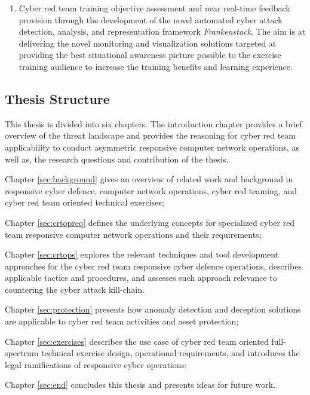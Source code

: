 \begin{enumerate}
    \item Cyber red team training objective assessment and near real-time feedback provision through the development of the novel automated cyber attack detection, analysis, and representation framework \textit{Frankenstack}. The aim is at delivering the novel monitoring and visualization solutions targeted at providing the best situational awareness picture possible to the exercise training audience to increase the training benefits and learning experience.
\end{enumerate}


\subsection{Thesis Structure}
\label{sec:structure}
\glsresetall
This thesis is divided into six chapters. The introduction chapter provides a brief overview of the threat landscape and provides the reasoning for cyber red team applicability to conduct asymmetric responsive computer network operations, as well as, the research questions and contribution of the thesis.

Chapter \ref{sec:background} gives an overview of related work and background in responsive cyber defence, computer network operations, cyber red teaming, and cyber red team oriented technical exercises;

Chapter \ref{sec:crtopreq} defines the underlying concepts for specialized cyber red team responsive computer network operations and their requirements;

Chapter \ref{sec:crtops} explores the relevant techniques and tool development approaches for the cyber red team responsive cyber defence operations, describes applicable tactics and procedures, and assesses such approach relevance to countering the cyber attack kill-chain.

Chapter \ref{sec:protection} presents how anomaly detection and deception solutions are applicable to cyber red team activities and asset protection;

Chapter \ref{sec:exercises} describes the use case of cyber red team oriented full-spectrum technical exercise design, operational requirements, and introduces the legal ramifications of responsive cyber operations;

Chapter \ref{sec:end} concludes this thesis and presents ideas for future work.
